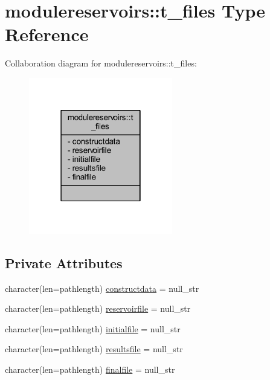 \hypertarget{structmodulereservoirs_1_1t__files}{}\section{modulereservoirs\+:\+:t\+\_\+files Type Reference}
\label{structmodulereservoirs_1_1t__files}


Collaboration diagram for modulereservoirs\+:\+:t\+\_\+files\+:\nopagebreak
\begin{figure}[H]
\begin{center}
\leavevmode
\includegraphics[width=178pt]{structmodulereservoirs_1_1t__files__coll__graph}
\end{center}
\end{figure}
\subsection*{Private Attributes}
\begin{DoxyCompactItemize}
\item 
character(len=pathlength) \mbox{\hyperlink{structmodulereservoirs_1_1t__files_a0c346a4808333b6e74eecbb5bdcb1cf2}{constructdata}} = null\+\_\+str
\item 
character(len=pathlength) \mbox{\hyperlink{structmodulereservoirs_1_1t__files_a1896e8dfd684246df3db5d95bc303d27}{reservoirfile}} = null\+\_\+str
\item 
character(len=pathlength) \mbox{\hyperlink{structmodulereservoirs_1_1t__files_afb6ae3d10ba8eed06e76457d70840685}{initialfile}} = null\+\_\+str
\item 
character(len=pathlength) \mbox{\hyperlink{structmodulereservoirs_1_1t__files_ad986eded43a92642373a9ad83f78600c}{resultsfile}} = null\+\_\+str
\item 
character(len=pathlength) \mbox{\hyperlink{structmodulereservoirs_1_1t__files_a412ffef204c52eacf6fda27de605b9a6}{finalfile}} = null\+\_\+str
\end{DoxyCompactItemize}


